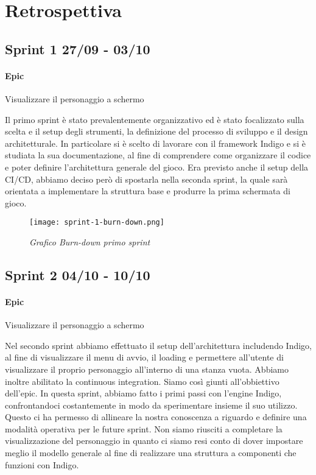 \section{Retrospettiva}

\subsection{Sprint 1 27/09 - 03/10}
\paragraph{Epic} Visualizzare il personaggio a schermo

Il primo sprint è stato prevalentemente organizzativo ed è stato focalizzato sulla scelta e il setup degli strumenti, la definizione del processo di sviluppo e il design architetturale. 
In particolare si è scelto di lavorare con il framework Indigo e si è studiata la sua documentazione, al fine di comprendere come organizzare il codice e poter definire l’architettura generale del gioco. 
Era previsto anche il setup della CI/CD, abbiamo deciso però di spostarla nella seconda sprint, la quale sarà orientata a implementare la struttura base e produrre la prima schermata di gioco. 

\begin{figure}[H]
    \centering
    \texttt{[image: sprint-1-burn-down.png]}
    \caption{\textit{Grafico Burn-down primo sprint}} 
\end{figure}

\newpage
\subsection{Sprint 2 04/10 - 10/10}
\paragraph{Epic} Visualizzare il personaggio a schermo

Nel secondo sprint abbiamo effettuato il setup dell'architettura includendo Indigo, al fine di visualizzare il menu di avvio, il loading e permettere all'utente di visualizzare il proprio personaggio all'interno di una stanza vuota. 
Abbiamo inoltre abilitato la continuous integration. Siamo così giunti all'obbiettivo dell'epic. In questa sprint, abbiamo fatto i primi passi con l'engine Indigo, confrontandoci costantemente in modo da sperimentare insieme il suo utilizzo. Questo ci ha permesso di allineare la nostra conoscenza a riguardo e definire una modalità operativa per le future sprint. 
Non siamo riusciti a completare la visualizzazione del personaggio in quanto ci siamo resi conto di dover impostare meglio il modello generale al fine di realizzare una struttura a componenti che funzioni con Indigo.

